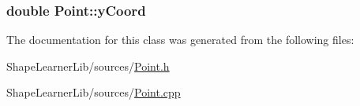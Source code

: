 \subsubsection[{y\+Coord}]{\setlength{\rightskip}{0pt plus 5cm}double Point\+::y\+Coord\hspace{0.3cm}{\ttfamily [private]}}\label{class_point_a47f5bf493a270e35fd80b96422469b6d}


The documentation for this class was generated from the following files\+:\begin{DoxyCompactItemize}
\item 
Shape\+Learner\+Lib/sources/\hyperlink{_point_8h}{Point.\+h}\item 
Shape\+Learner\+Lib/sources/\hyperlink{_point_8cpp}{Point.\+cpp}\end{DoxyCompactItemize}
